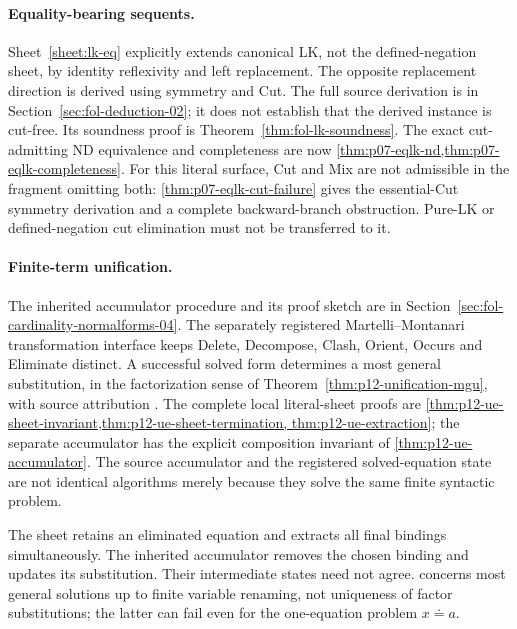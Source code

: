 \paragraph{Equality-bearing sequents.}
Sheet~\ref{sheet:lk-eq} explicitly extends canonical LK, not the
defined-negation sheet, by identity reflexivity and left replacement.
The opposite replacement direction is derived using symmetry and Cut.
The full source derivation is in Section~\ref{sec:fol-deduction-02}; it
does not establish that the derived instance is cut-free.  Its soundness
proof is Theorem~\ref{thm:fol-lk-soundness}. The exact cut-admitting
ND equivalence and completeness are now
\cref{thm:p07-eqlk-nd,thm:p07-eqlk-completeness}. For this literal
surface, Cut and Mix are not admissible in the fragment omitting both:
\cref{thm:p07-eqlk-cut-failure} gives the essential-Cut symmetry
derivation and a complete backward-branch obstruction. Pure-LK or
defined-negation cut elimination must not be transferred to it.


\paragraph{Finite-term unification.}
The inherited accumulator procedure and its proof sketch are in
Section~\ref{sec:fol-cardinality-normalforms-04}.  The separately registered
Martelli--Montanari transformation interface keeps Delete, Decompose,
Clash, Orient, Occurs and Eliminate distinct.  A successful solved form
determines a most general substitution, in the factorization sense of
Theorem~\ref{thm:p12-unification-mgu}, with source attribution
\cite{MartelliMontanari1982,BaaderSnyder2001}. The complete local literal-sheet
proofs are \cref{thm:p12-ue-sheet-invariant,thm:p12-ue-sheet-termination,
thm:p12-ue-extraction}; the separate accumulator has the explicit composition
invariant of \cref{thm:p12-ue-accumulator}.
The source accumulator and the registered solved-equation state are not
identical algorithms merely because they solve the same finite syntactic
problem.

The sheet retains an eliminated equation and extracts all final bindings
simultaneously. The inherited accumulator removes the chosen binding and
updates its substitution. Their intermediate states need not agree.
 concerns most general solutions up to finite
variable renaming, not uniqueness of factor substitutions; the latter
can fail even for the one-equation problem \(x\doteq a\).

